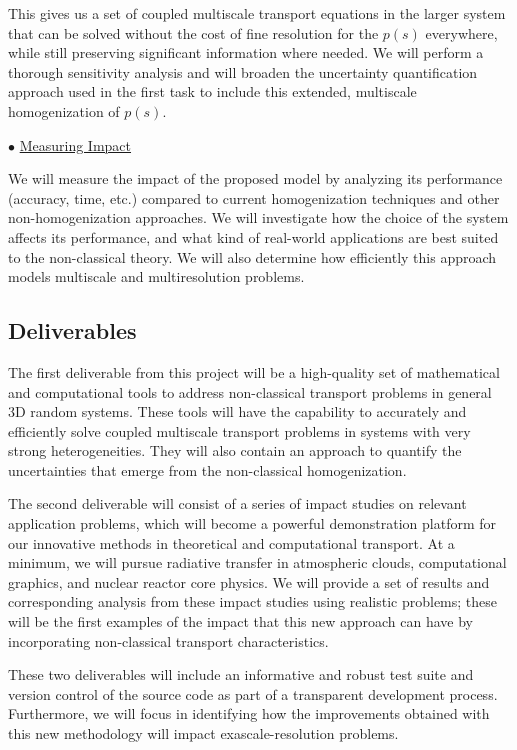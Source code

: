 \documentclass[12pt]{article}
\begin{document}
This gives us a set of coupled multiscale transport equations in the larger system that can be solved without the cost of fine resolution for the $p(s)$ everywhere, while still preserving significant information where needed.
We will perform a thorough sensitivity analysis and will broaden the uncertainty quantification approach used in the first task to include this extended, multiscale homogenization of $p(s)$. 

$\bullet$ \underline{Measuring Impact}

We will measure the impact of the proposed model by analyzing its performance (accuracy, time, etc.) compared to current homogenization techniques and other non-homogenization approaches.
We will investigate how the choice of the system affects its performance, and what kind of real-world applications are best suited to the non-classical theory.
We will also determine how efficiently this approach models multiscale and multiresolution problems.


\subsection{Deliverables}

The first deliverable from this project will be a high-quality set of mathematical and computational tools to address non-classical transport problems in general 3D random systems.
These tools will have the capability to accurately and efficiently solve coupled multiscale transport problems in systems with very strong heterogeneities.
They will also contain an approach to quantify the uncertainties that emerge from the non-classical homogenization.

The second deliverable will consist of a series of impact studies on relevant application problems, which will become a powerful demonstration platform for our innovative methods in theoretical and computational transport.
At a minimum, we will pursue radiative transfer in atmospheric clouds, computational graphics, and nuclear reactor core physics.
We will provide a set of results and corresponding analysis from these impact studies using realistic problems;
these will be the first examples of the impact that this new approach can have by incorporating non-classical transport characteristics.

These two deliverables will include an informative and robust test suite and version control of the source code as part of a transparent development process.
Furthermore, we will focus in identifying how the improvements obtained with this new methodology will impact exascale-resolution problems.
\end{document}
